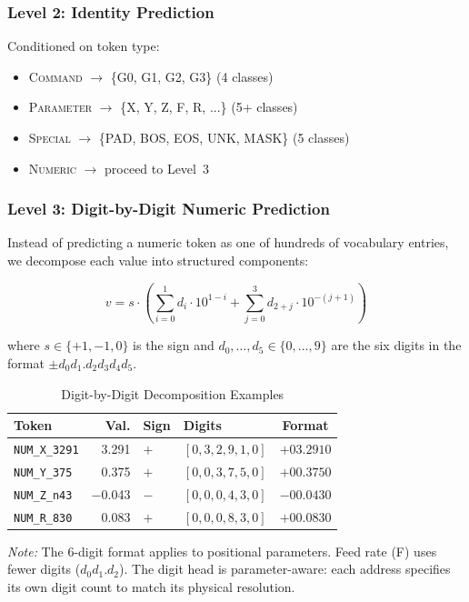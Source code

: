 \documentclass[sensors,article,submit,moreauthors,pdftex]{Definitions/mdpi}
\begin{document}
\subsubsection{Level 2: Identity Prediction}

Conditioned on token type:
\begin{itemize}[leftmargin=*]
    \item \textsc{Command} $\to$ \{G0, G1, G2, G3\} (4 classes)
    \item \textsc{Parameter} $\to$ \{X, Y, Z, F, R, ...\} (5+ classes)
    \item \textsc{Special} $\to$ \{PAD, BOS, EOS, UNK, MASK\} (5 classes)
    \item \textsc{Numeric} $\to$ proceed to Level~3
\end{itemize}

\subsubsection{Level 3: Digit-by-Digit Numeric Prediction}

Instead of predicting a numeric token as one of hundreds of vocabulary entries, we decompose each value into structured components:

\begin{equation}
    v = s \cdot \left( \sum_{i=0}^{1} d_i \cdot 10^{1-i} + \sum_{j=0}^{3} d_{2+j} \cdot 10^{-(j+1)} \right)
\end{equation}

where $s \in \{+1, -1, 0\}$ is the sign and $d_0, \ldots, d_5 \in \{0, \ldots, 9\}$ are the six digits in the format $\pm d_0 d_1 . d_2 d_3 d_4 d_5$.

\begin{table}[htbp]
\centering
\caption{Digit-by-Digit Decomposition Examples}
\label{tab:digit_examples}
\small
\begin{tabular}{@{}lrllc@{}}
\toprule
\textbf{Token} & \textbf{Val.} & \textbf{Sign} & \textbf{Digits} & \textbf{Format} \\
\midrule
\texttt{NUM\_X\_3291}  & 3.291  & $+$ & $[0,3,2,9,1,0]$ & $+03.2910$ \\
\texttt{NUM\_Y\_375}   & 0.375  & $+$ & $[0,0,3,7,5,0]$ & $+00.3750$ \\
\texttt{NUM\_Z\_n43}   & $-$0.043 & $-$ & $[0,0,0,4,3,0]$ & $-00.0430$ \\
\texttt{NUM\_R\_830}   & 0.083  & $+$ & $[0,0,0,8,3,0]$ & $+00.0830$ \\
\bottomrule
\end{tabular}
\normalsize

{\small\textit{Note:} The 6-digit format applies to positional parameters. Feed rate (F) uses fewer digits ($d_0 d_1.d_2$). The digit head is parameter-aware: each address specifies its own digit count to match its physical resolution.}
\end{table}
\end{document}
